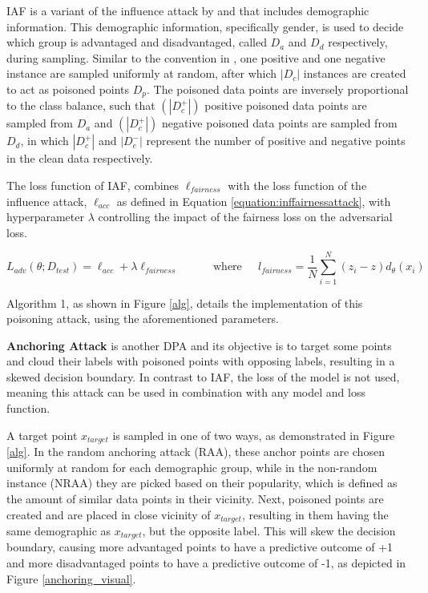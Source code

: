 IAF is a variant of the influence attack by \cite{koh2018stronger} and \cite{koh2017understanding} that includes demographic information.
This demographic information, specifically gender, is used to decide which group is advantaged and disadvantaged, called $D_a$ and $D_d$ respectively, during sampling.
Similar to the convention in \cite{koh2018stronger}, one positive and one negative instance are sampled uniformly at random, after which $|D_c|$ instances are created to act as poisoned points $D_p$.
The poisoned data points are inversely proportional to the class balance, such that $(|D^+_c|)$ positive poisoned data points are sampled from $D_a$ and  $(|D^+_c|)$ negative poisoned data points are sampled from $D_d$, in which $|D^+_c|$ and $|D^-_c|$ represent the number of positive and negative points in the clean data respectively. 

The loss function of IAF, combines $\ell_{fairness}$ with the loss function of the influence attack, $\ell_{acc}$ as defined in Equation \ref{equation:inffairnessattack}, with hyperparameter $\lambda$ controlling the impact of the fairness loss on the adversarial loss. 

\begin{equation}
        L_{adv}(\theta ; D_{test}) = \ell_{acc} + \lambda \ell_{fairness} \;\;\;\;\;\;\;\;\;\;\; 
        \mbox{where  } \;\;\;\; l_{fairness} = \frac{1}{N}\sum^N_{i=1}(z_i -z)d_{\theta}(x_i)
    \label{equation:inffairnessattack}
\end{equation}


Algorithm 1, as shown in Figure \ref{alg}, details the implementation of this poisoning attack, using the aforementioned parameters. 

\textbf{Anchoring Attack}
is another DPA and its objective is to target some points and cloud their labels with poisoned points with opposing labels, resulting in a skewed decision boundary.
In contrast to IAF, the loss of the model is not used, meaning this attack can be used in combination with any model and loss function. 

A target point $x_{target}$ is sampled in one of two ways, as demonstrated in Figure \ref{alg}. In the random anchoring attack (RAA), these anchor points are chosen uniformly at random for each demographic group, while in the non-random instance (NRAA) they are picked based on their popularity, which is defined as the amount of similar data points in their vicinity.
Next, poisoned points are created and are placed in close vicinity of $x_{target}$, resulting in them having the same demographic as $x_{target}$, but the opposite label.
This will skew the decision boundary, causing more advantaged points to have a predictive outcome of +1 and more disadvantaged points to have a predictive outcome of -1, as depicted in Figure \ref{anchoring_visual}.

